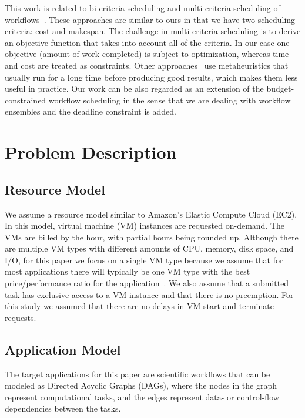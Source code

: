 \documentclass{sig-alternate}
\begin{document}
This work is related to bi-criteria scheduling and multi-criteria scheduling of
workflows~\cite{Wieczorek2009,Prodan10,Dongarra2007}. These approaches are
similar to ours in that we have two scheduling criteria: cost and makespan. The
challenge in multi-criteria scheduling is to derive an objective function that
takes into account all of the criteria. In our case one objective (amount
of work completed) is subject to optimization, whereas time and cost are
treated as constraints. Other approaches~\cite{Talukder2009,Pandey2010} use
metaheuristics that usually run for a long time before producing good results,
which makes them less useful in practice. Our work can be also
regarded as an extension of the budget-constrained workflow scheduling
\cite{Sakellariou2007} in the sense that we are dealing with workflow ensembles
and the deadline constraint is added.
 
\section{Problem Description}
\label{sec:problem}

\subsection{Resource Model}

We assume a resource model similar to Amazon's Elastic Compute Cloud (EC2). In
this model, virtual machine (VM) instances are requested on-demand. The VMs are
billed by the hour, with partial hours being rounded up. Although there are
multiple VM types with different amounts of CPU, memory, disk space, and I/O,
for this paper we focus on a single VM type because we assume that for most
applications there will typically be one VM type with the best price/performance
ratio for the application~\cite{Juve2009}. We also assume that a submitted task
has exclusive access to a VM instance and that there is no preemption. For this
study we assumed that there are no delays in VM start and terminate requests.


\subsection{Application Model}
The target applications for this paper are scientific workflows that can be
modeled as Directed Acyclic Graphs (DAGs), where the nodes in the graph
represent computational tasks, and the edges represent data- or control-flow
dependencies between the tasks.
\end{document}

